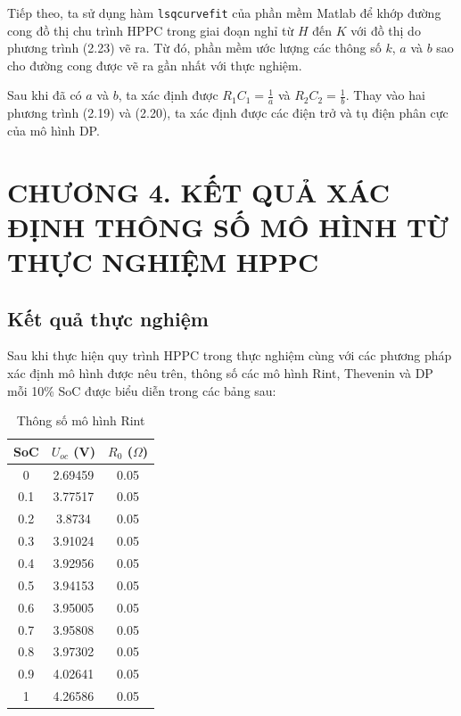 \documentclass{thesis}
\begin{document}
Tiếp theo, ta sử dụng hàm \texttt{lsqcurvefit} của phần mềm Matlab để khớp đường cong đồ thị chu trình HPPC trong giai đoạn nghỉ từ \( H \) đến \( K \) với đồ thị do phương trình (2.23) vẽ ra. Từ đó, phần mềm ước lượng các thông số \( k \), \( a \) và \( b \) sao cho đường cong được vẽ ra gần nhất với thực nghiệm.

Sau khi đã có \( a \) và \( b \), ta xác định được \( R_1 C_1 = \frac{1}{a} \) và \( R_2 C_2 = \frac{1}{b} \). Thay vào hai phương trình (2.19) và (2.20), ta xác định được các điện trở và tụ điện phân cực của mô hình DP.
\newpage
    \section*{CHƯƠNG 4. KẾT QUẢ XÁC ĐỊNH THÔNG SỐ MÔ HÌNH TỪ THỰC NGHIỆM HPPC}
    \setcounter{section}{4}
    \setcounter{subsection}{0}
    \setcounter{figure}{0}
    \setcounter{table}{0}

    \subsection{Kết quả thực nghiệm}
    Sau khi thực hiện quy trình HPPC trong thực nghiệm cùng với các phương pháp xác định mô hình được nêu trên, thông số các mô hình Rint, Thevenin và DP mỗi 10\% SoC được biểu diễn trong các bảng sau:

    \begin{table}[H]
        \centering
        \begin{tabular}{|c|c|c|}
            \hline
            \textbf{SoC} & \textbf{$U_{oc}$ (V)} & \textbf{$R_0$ ($\Omega$)} \\
            \hline
            0 & 2.69459 & 0.05 \\
            0.1 & 3.77517 & 0.05 \\
            0.2 & 3.8734 & 0.05 \\
            0.3 & 3.91024 & 0.05 \\
            0.4 & 3.92956 & 0.05 \\
            0.5 & 3.94153 & 0.05 \\
            0.6 & 3.95005 & 0.05 \\
            0.7 & 3.95808 & 0.05 \\
            0.8 & 3.97302 & 0.05 \\
            0.9 & 4.02641 & 0.05 \\
            1 & 4.26586 & 0.05 \\
            \hline
        \end{tabular}
        \caption{Thông số mô hình Rint}
        \label{tab:rint}
    \end{table}
\end{document}
